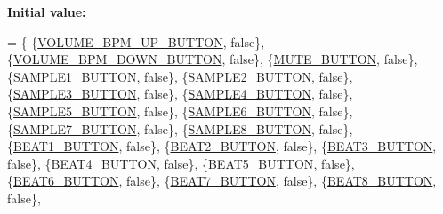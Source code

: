 {\bfseries Initial value\+:}
\begin{DoxyCode}
= \{
            \{\hyperlink{namespaceinputs_ab1d58fe937ccabff6ec4011a74028bfb}{VOLUME\_BPM\_UP\_BUTTON},   \textcolor{keyword}{false}\},
            \{\hyperlink{namespaceinputs_af3cad6ab00b2670e1710698945d28c17}{VOLUME\_BPM\_DOWN\_BUTTON}, \textcolor{keyword}{false}\},
            \{\hyperlink{namespaceinputs_af0075a72395787966efcec2403306b43}{MUTE\_BUTTON},            \textcolor{keyword}{false}\},
            \{\hyperlink{namespaceinputs_a39dbaf6935309e198c1a0bc6e3468c45}{SAMPLE1\_BUTTON},         \textcolor{keyword}{false}\},
            \{\hyperlink{namespaceinputs_afcf2086c7f58f801e5654d8e573d928c}{SAMPLE2\_BUTTON},         \textcolor{keyword}{false}\},
            \{\hyperlink{namespaceinputs_a17158d35ca30fb91c6f9f757ce0d7ccc}{SAMPLE3\_BUTTON},         \textcolor{keyword}{false}\},
            \{\hyperlink{namespaceinputs_ac9ccac580f0955e454a367ddc6421d78}{SAMPLE4\_BUTTON},         \textcolor{keyword}{false}\},
            \{\hyperlink{namespaceinputs_ad22ade847b4a38fd418dccda07814551}{SAMPLE5\_BUTTON},         \textcolor{keyword}{false}\},
            \{\hyperlink{namespaceinputs_a88edcfa8b89df1abcca33bcec05974c4}{SAMPLE6\_BUTTON},         \textcolor{keyword}{false}\},
            \{\hyperlink{namespaceinputs_a50972dcf524a7b7c420ca75b0ba72a29}{SAMPLE7\_BUTTON},         \textcolor{keyword}{false}\},
            \{\hyperlink{namespaceinputs_a85f389284c616cd584390d04ad192ced}{SAMPLE8\_BUTTON},         \textcolor{keyword}{false}\},
            \{\hyperlink{namespaceinputs_af62021422f469c370f42c78a72504a66}{BEAT1\_BUTTON},           \textcolor{keyword}{false}\},
            \{\hyperlink{namespaceinputs_a8cdd33c9e53b617a2cf8bd32a5b74484}{BEAT2\_BUTTON},           \textcolor{keyword}{false}\},
            \{\hyperlink{namespaceinputs_ab60a6fc2188a034f76d3fbe554efe314}{BEAT3\_BUTTON},           \textcolor{keyword}{false}\},
            \{\hyperlink{namespaceinputs_af65f26f63a9572003a2bc49e7955e319}{BEAT4\_BUTTON},           \textcolor{keyword}{false}\},
            \{\hyperlink{namespaceinputs_a8a027829529daa53a24ece7b8334164b}{BEAT5\_BUTTON},           \textcolor{keyword}{false}\},
            \{\hyperlink{namespaceinputs_a6afdc23bce21454342081cf937e47ab9}{BEAT6\_BUTTON},           \textcolor{keyword}{false}\},
            \{\hyperlink{namespaceinputs_ac74e302394a578b31f0cf44df8cbb1a9}{BEAT7\_BUTTON},           \textcolor{keyword}{false}\},
            \{\hyperlink{namespaceinputs_abfcd4d28221c436391131a27402ea620}{BEAT8\_BUTTON},           \textcolor{keyword}{false}\},

\end{DoxyCode}
